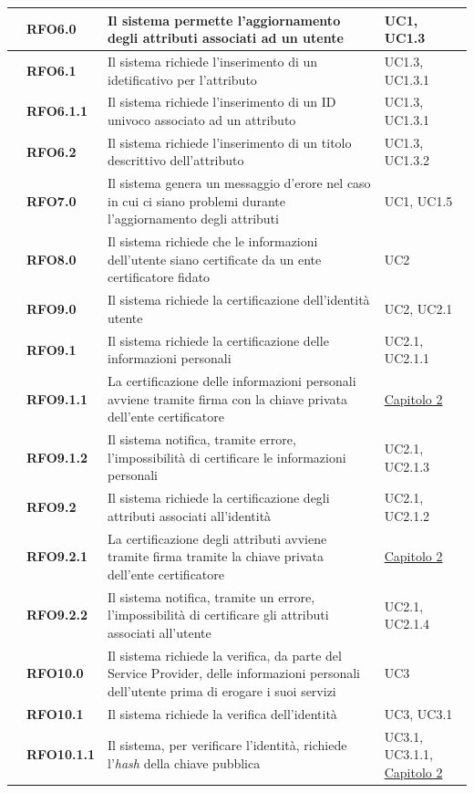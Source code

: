 \begin{longtable}{|r l|p{10cm}|p{2cm}|}
	&\textbf{RFO6.0}&Il sistema permette l'aggiornamento degli attributi associati ad un utente&UC1, UC1.3 \\\hline
	&\textbf{RFO6.1}&Il sistema richiede l'inserimento di un idetificativo per l'attributo&UC1.3, UC1.3.1 \\\hline
	&\textbf{RFO6.1.1}&Il sistema richiede l'inserimento di un ID univoco associato ad un attributo&UC1.3, UC1.3.1 \\\hline
	&\textbf{RFO6.2}&Il sistema richiede l'inserimento di un titolo descrittivo dell'attributo &UC1.3, UC1.3.2 \\\hline
	&\textbf{RFO7.0}&Il sistema genera un messaggio d'erore nel caso in cui ci siano problemi durante l'aggiornamento degli attributi&UC1, UC1.5 \\\hline
	&\textbf{RFO8.0}&Il sistema richiede che le informazioni dell'utente siano certificate da un ente certificatore fidato&UC2 \\\hline
	&\textbf{RFO9.0}&Il sistema richiede la certificazione dell'identità utente&UC2, UC2.1 \\\hline
	&\textbf{RFO9.1}&Il sistema richiede la certificazione delle informazioni personali&UC2.1, UC2.1.1 \\\hline
	&\textbf{RFO9.1.1}&La certificazione delle informazioni personali avviene tramite firma con la chiave privata dell'ente certificatore&\hyperref[cap:tecnologie_e_strumenti]{Capitolo 2} \\\hline
	&\textbf{RFO9.1.2}&Il sistema notifica, tramite errore, l'impossibilità di certificare le informazioni personali &UC2.1, UC2.1.3 \\\hline
	&\textbf{RFO9.2}&Il sistema richiede la certificazione degli attributi associati all'identità &UC2.1, UC2.1.2 \\\hline
	&\textbf{RFO9.2.1}&La certificazione degli attributi avviene tramite firma tramite la chiave privata dell'ente certificatore &\hyperref[cap:tecnologie_e_strumenti]{Capitolo 2} \\\hline
	&\textbf{RFO9.2.2}&Il sistema notifica, tramite un errore, l'impossibilità di certificare gli attributi associati all'utente &UC2.1, UC2.1.4 \\\hline
	&\textbf{RFO10.0}&Il sistema richiede la verifica, da parte del Service Provider, delle informazioni personali dell'utente prima di erogare i suoi servizi &UC3 \\\hline
	&\textbf{RFO10.1}&Il sistema richiede la verifica dell'identità &UC3, UC3.1 \\\hline
	&\textbf{RFO10.1.1}&Il sistema, per verificare l'identità, richiede l'\textit{hash} della chiave pubblica &UC3.1, UC3.1.1, \hyperref[cap:tecnologie_e_strumenti]{Capitolo 2} \\\hline

\end{longtable}
